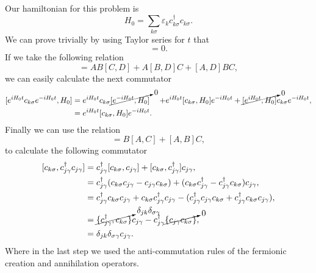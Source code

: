 \begin{questions}
\begin{solution}
  Our hamiltonian for this problem is
  \begin{equation}
    H_0 = \sum_{k\sigma} \varepsilon_k c_{k\sigma}^\dagger c_{k\sigma}.
  \end{equation}
  We can prove trivially by using Taylor series for $t$ that
  \begin{equation}
    [e^{\pm iH_0 t},H_0] = 0.
  \end{equation}
  If we take the following relation
  \begin{equation}
    [ABC,D] = AB[C,D] + A[B,D]C + [A,D]BC,
  \end{equation}
  we can easily calculate the next commutator
  \begin{equation}
    \begin{aligned}[b]
      [e^{iH_0 t} c_{k\sigma} e^{- iH_0 t}, H_0] &= e^{iH_0 t} c_{k\sigma}\cancelto{0}{[ e^{- iH_0 t}, H_0]}
      &+ e^{iH_0 t}[ c_{k\sigma} , H_0]e^{- iH_0 t} + \cancelto{0}{[e^{iH_0 t} , H_0]}c_{k\sigma} e^{- iH_0 t},\\
      & = e^{iH_0 t}[ c_{k\sigma} , H_0]e^{- iH_0 t}.
      \label{aux1}
    \end{aligned}
  \end{equation}
  Finally we can use the relation
  \begin{equation}
    [A,BC] = B[A,C] + [A,B]C,
  \end{equation}
  to calculate the following commutator
  \begin{equation}
    \begin{aligned}[b]
      [c_{k\sigma},c_{j\gamma}^\dagger c_{j\gamma}] &=  c_{j\gamma}^\dagger [c_{k\sigma},c_{j\gamma}]+[c_{k\sigma},c_{j\gamma}^\dagger ]c_{j\gamma}, \\
      &= c_{j\gamma}^\dagger (c_{k\sigma}c_{j\gamma} - c_{j\gamma}c_{k\sigma}) + (c_{k\sigma}c_{j\gamma}^\dagger - c_{j\gamma}^\dagger c_{k\sigma})c_{j\gamma},\\
      &= c_{j\gamma}^\dagger c_{k\sigma}c_{j\gamma} + c_{k\sigma}c_{j\gamma}^\dagger c_{j\gamma} - (c_{j\gamma}^\dagger c_{j\gamma}c_{k\sigma}  + c_{j\gamma}^\dagger c_{k\sigma}c_{j\gamma}),\\
      &= \cancelto{\delta_{jk}\delta_{\sigma \gamma}}{\{c_{j\gamma}^\dagger, c_{k\sigma} \}} c_{j\gamma} - c_{j\gamma}^\dagger \cancelto{0}{\{c_{j\gamma}c_{k\sigma}\}},\\
      &= \delta_{jk}\delta_{\sigma \gamma} c_{j\gamma}.
      \label{aux2}
    \end{aligned}
  \end{equation}
  Where in the last step we used the anti-commutation rules of the fermionic creation and annihilation operators.\\


\end{solution}
\end{questions}
